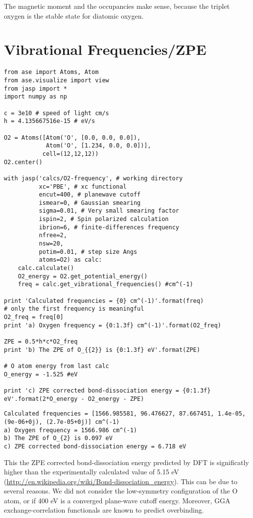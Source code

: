 \documentclass[11pt]{article}
\begin{document}
The magnetic moment and the occupancies make sense, because the triplet oxygen is the stable state for diatomic oxygen.

\section{Vibrational Frequencies/ZPE}
\label{sec-5}

\begin{verbatim}
from ase import Atoms, Atom
from ase.visualize import view
from jasp import *
import numpy as np

c = 3e10 # speed of light cm/s
h = 4.135667516e-15 # eV/s

O2 = Atoms([Atom('O', [0.0, 0.0, 0.0]),
            Atom('O', [1.234, 0.0, 0.0])],
           cell=(12,12,12))
O2.center()

with jasp('calcs/O2-frequency', # working directory
          xc='PBE', # xc functional
          encut=400, # planewave cutoff
          ismear=0, # Gaussian smearing
          sigma=0.01, # Very small smearing factor
          ispin=2, # Spin polarized calculation
          ibrion=6, # finite-differences frequency
          nfree=2,
          nsw=20,
          potim=0.01, # step size Angs
          atoms=O2) as calc:
    calc.calculate()
    O2_energy = O2.get_potential_energy()
    freq = calc.get_vibrational_frequencies() #cm^(-1)

print 'Calculated frequencies = {0} cm^(-1)'.format(freq)
# only the first frequency is meaningful
O2_freq = freq[0]
print 'a) Oxygen frequency = {0:1.3f} cm^(-1)'.format(O2_freq)

ZPE = 0.5*h*c*O2_freq
print 'b) The ZPE of O_{{2}} is {0:1.3f} eV'.format(ZPE)

# O atom energy from last calc
O_energy = -1.525 #eV

print 'c) ZPE corrected bond-dissociation energy = {0:1.3f} eV'.format(2*O_energy - O2_energy - ZPE)
\end{verbatim}

\begin{verbatim}
Calculated frequencies = [1566.985581, 96.476627, 87.667451, 1.4e-05, (9e-06+0j), (2.7e-05+0j)] cm^(-1)
a) Oxygen frequency = 1566.986 cm^(-1)
b) The ZPE of O_{2} is 0.097 eV
c) ZPE corrected bond-dissociation energy = 6.718 eV
\end{verbatim}

This the ZPE corrected bond-dissociation energy predicted by DFT is significatly higher than the experimentally calculated value of 5.15 eV (\url{http://en.wikipedia.org/wiki/Bond-dissociation_energy}). This can be due to several reasons. We did not consider the low-symmetry configuration of the O atom, or if 400 eV is a converged plane-wave cutoff energy. Moreover, GGA exchange-correlation  functionals are known to predict overbinding.
\end{document}
